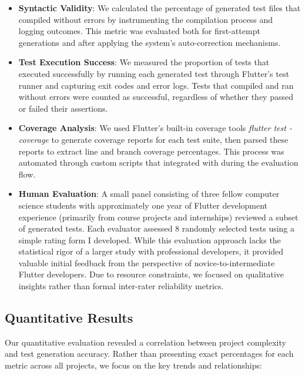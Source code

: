 \begin{itemize}
    \item \textbf{Syntactic Validity}: We calculated the percentage of generated test files that compiled without errors by instrumenting the compilation process and logging outcomes. This metric was evaluated both for first-attempt generations and after applying the system's auto-correction mechanisms.
    
    \item \textbf{Test Execution Success}: We measured the proportion of tests that executed successfully by running each generated test through Flutter's test runner and capturing exit codes and error logs. Tests that compiled and ran without errors were counted as successful, regardless of whether they passed or failed their assertions.
    
    \item \textbf{Coverage Analysis}: We used Flutter's built-in coverage tools \textit{flutter test -\-coverage} to generate coverage reports for each test suite, then parsed these reports to extract line and branch coverage percentages. This process was automated through custom scripts that integrated with during the evaluation flow.

    \item \textbf{Human Evaluation}: A small panel consisting of three fellow computer science students with approximately one year of Flutter development experience (primarily from course projects and internships) reviewed a subset of generated tests. Each evaluator assessed 8 randomly selected tests using a simple rating form I developed. While this evaluation approach lacks the statistical rigor of a larger study with professional developers, it provided valuable initial feedback from the perspective of novice-to-intermediate Flutter developers. Due to resource constraints, we focused on qualitative insights rather than formal inter-rater reliability metrics.
\end{itemize}

\subsection{Quantitative Results}

Our quantitative evaluation revealed a correlation between project complexity and test generation accuracy. Rather than presenting exact percentages for each metric across all projects, we focus on the key trends and relationships:

